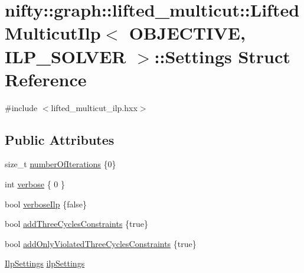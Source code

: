 \hypertarget{structnifty_1_1graph_1_1lifted__multicut_1_1LiftedMulticutIlp_1_1Settings}{}\section{nifty\+:\+:graph\+:\+:lifted\+\_\+multicut\+:\+:Lifted\+Multicut\+Ilp$<$ O\+B\+J\+E\+C\+T\+I\+V\+E, I\+L\+P\+\_\+\+S\+O\+L\+V\+E\+R $>$\+:\+:Settings Struct Reference}
\label{structnifty_1_1graph_1_1lifted__multicut_1_1LiftedMulticutIlp_1_1Settings}


{\ttfamily \#include $<$lifted\+\_\+multicut\+\_\+ilp.\+hxx$>$}

\subsection*{Public Attributes}
\begin{DoxyCompactItemize}
\item 
size\+\_\+t \hyperlink{structnifty_1_1graph_1_1lifted__multicut_1_1LiftedMulticutIlp_1_1Settings_aed977e0d4a3d50cda324d49aebf9533f}{number\+Of\+Iterations} \{0\}
\item 
int \hyperlink{structnifty_1_1graph_1_1lifted__multicut_1_1LiftedMulticutIlp_1_1Settings_aba3639b15a40ae83625329c0c2c8515a}{verbose} \{ 0 \}
\item 
bool \hyperlink{structnifty_1_1graph_1_1lifted__multicut_1_1LiftedMulticutIlp_1_1Settings_a07d81750dca3eee9de46938032aede72}{verbose\+Ilp} \{false\}
\item 
bool \hyperlink{structnifty_1_1graph_1_1lifted__multicut_1_1LiftedMulticutIlp_1_1Settings_a8d8997a2c8fe7fff89731e2dbe9a6a68}{add\+Three\+Cycles\+Constraints} \{true\}
\item 
bool \hyperlink{structnifty_1_1graph_1_1lifted__multicut_1_1LiftedMulticutIlp_1_1Settings_ab1261dbf0850df7b38e4c319f3a85069}{add\+Only\+Violated\+Three\+Cycles\+Constraints} \{true\}
\item 
\hyperlink{classnifty_1_1graph_1_1lifted__multicut_1_1LiftedMulticutIlp_a1660192dd643891762ce8f0e576a7053}{Ilp\+Settings} \hyperlink{structnifty_1_1graph_1_1lifted__multicut_1_1LiftedMulticutIlp_1_1Settings_a7520f4c7369ee46e43721bb7b736c696}{ilp\+Settings}
\end{DoxyCompactItemize}


